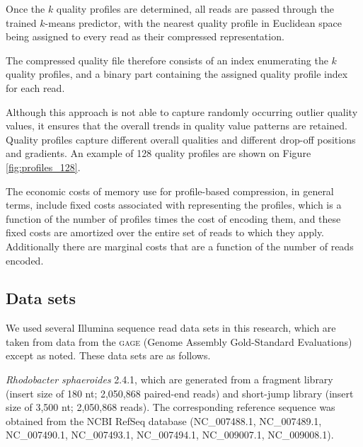 \documentclass{bioinfo}
\begin{document}
\begin{methods}
Once the $k$ quality profiles are determined, all reads
are passed through the trained $k$-means predictor, with the nearest
quality profile in Euclidean space being assigned to every read
as their compressed representation.

The compressed quality file therefore consists of an index enumerating
the $k$ quality profiles, and a binary part containing the assigned
quality profile index for each read.

Although this approach is not able to capture randomly occurring
outlier quality values, it ensures that the overall trends in quality
value patterns are retained. Quality profiles capture different overall
qualities and different drop-off positions and gradients. An example
of 128 quality profiles are shown on Figure \ref{fig:profiles_128}.

The economic costs of memory use for profile-based compression, in
general terms, include fixed costs associated with representing the
profiles, which is a function of the number of profiles times the cost
of encoding them, and these fixed costs are amortized over the entire
set of reads to which they apply. Additionally there are marginal
costs that are a function of the number of reads encoded.

\subsection{Data sets}

We used several Illumina sequence read data sets in this research,
which are taken from data from the \textsc{gage} (Genome Assembly
Gold-Standard Evaluations)~\citep{Salzberg:2012rc} except as
noted. These data sets are as follows.

\textit{Rhodobacter sphaeroides} 2.4.1, which are generated from a
fragment library (insert size of 180 nt; 2,050,868 paired-end reads)
and short-jump library (insert size of 3,500 nt; 2,050,868 reads). The
corresponding reference sequence was obtained from the NCBI RefSeq
database (NC\_007488.1, NC\_007489.1, NC\_007490.1, NC\_007493.1,
NC\_007494.1, NC\_009007.1, NC\_009008.1).



\end{methods}
\end{document}

